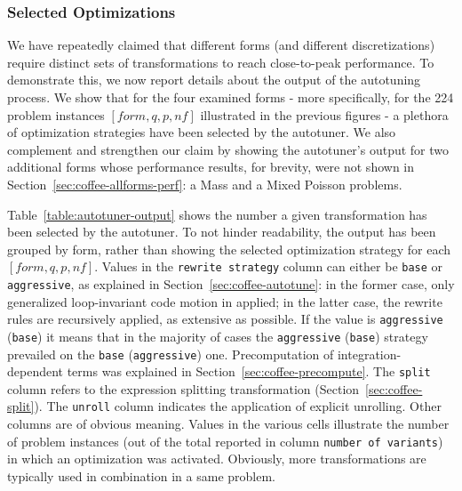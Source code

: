 \subsubsection{Selected Optimizations}
We have repeatedly claimed that different forms (and different discretizations) require distinct sets of transformations to reach close-to-peak performance. To demonstrate this, we now report details about the output of the autotuning process. We show that for the four examined forms - more specifically, for the 224 problem instances $[form, q, p, nf]$ illustrated in the previous figures - a plethora of optimization strategies have been selected by the autotuner. We also complement and strengthen our claim by showing the autotuner's output for two additional forms whose performance results, for brevity, were not shown in Section~\ref{sec:coffee-allforms-perf}: a Mass and a Mixed Poisson problems. 

Table~\ref{table:autotuner-output} shows the number a given transformation has been selected by the autotuner. To not hinder readability, the output has been grouped by form, rather than showing the selected optimization strategy for each $[form, q, p, nf]$. Values in the \texttt{rewrite strategy} column can either be \texttt{base} or \texttt{aggressive}, as explained in Section~\ref{sec:coffee-autotune}: in the former case, only generalized loop-invariant code motion in applied; in the latter case, the rewrite rules are recursively applied, as extensive as possible. If the value is \texttt{aggressive} (\texttt{base}) it means that in the majority of cases the \texttt{aggressive} (\texttt{base}) strategy prevailed on the \texttt{base} (\texttt{aggressive}) one. Precomputation of integration-dependent terms was explained in Section~\ref{sec:coffee-precompute}. The \texttt{split} column refers to the expression splitting transformation (Section~\ref{sec:coffee-split}). The \texttt{unroll} column indicates the application of explicit unrolling. Other columns are of obvious meaning. Values in the various cells illustrate the number of problem instances (out of the total reported in column \texttt{number of variants}) in which an optimization was activated. Obviously, more transformations are typically used in combination in a same problem. 

